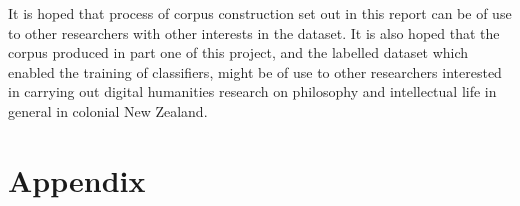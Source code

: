 \documentclass{article}
\begin{document}
It is hoped that process of corpus construction set out in this report can be of use to other researchers with other interests in the dataset. It is also hoped that the corpus produced in part one of this project, and the labelled dataset which enabled the training of classifiers, might be of use to other researchers interested in carrying out digital humanities research on philosophy and intellectual life in general in colonial New Zealand.

\printbibliography

\renewcommand\thesection{\Alph{section}}
\setcounter{section}{0}
\setcounter{subsection}{0}
\setcounter{table}{0}
\section{Appendix}
\end{document}
